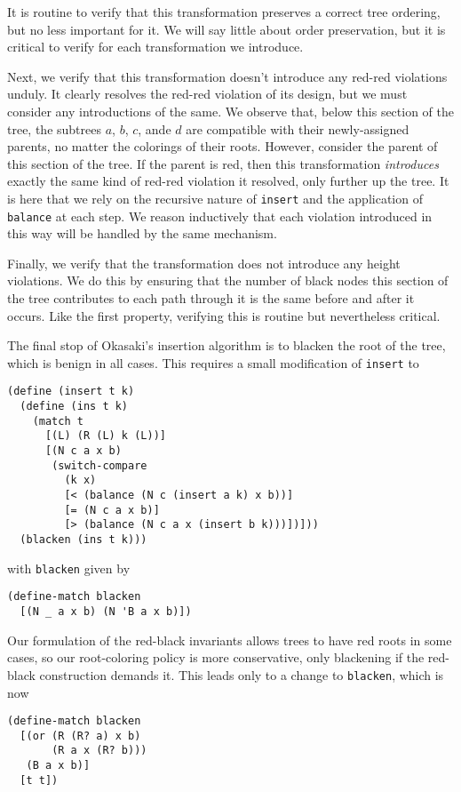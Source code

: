 \documentclass[preprint]{sigplanconf}
\begin{document}
It is routine to verify that this transformation preserves a correct tree ordering, but no less important for it. We will say little about order preservation, but it is critical to verify for each transformation we introduce.

Next, we verify that this transformation doesn't introduce any red-red violations unduly. It clearly resolves the red-red violation of its design, but we must consider any introductions of the same. We observe that, below this section of the tree, the subtrees $a$, $b$, $c$, ande $d$ are compatible with their newly-assigned parents, no matter the colorings of their roots. However, consider the parent of this section of the tree. If the parent is red, then this transformation \emph{introduces} exactly the same kind of red-red violation it resolved, only further up the tree. It is here that we rely on the recursive nature of \texttt{insert} and the application of \texttt{balance} at each step. We reason inductively that each violation introduced in this way will be handled by the same mechanism.

Finally, we verify that the transformation does not introduce any height violations. We do this by ensuring that the number of black nodes this section of the tree contributes to each path through it is the same before and after it occurs. Like the first property, verifying this is routine but nevertheless critical.

The final stop of Okasaki's insertion algorithm is to blacken the root of the tree, which is benign in all cases. This requires a small modification of \texttt{insert} to 
\begin{verbatim}
(define (insert t k)
  (define (ins t k)
    (match t
      [(L) (R (L) k (L))]
      [(N c a x b)
       (switch-compare
         (k x)
         [< (balance (N c (insert a k) x b))]
         [= (N c a x b)]
         [> (balance (N c a x (insert b k)))])]))
  (blacken (ins t k)))
\end{verbatim}
with \texttt{blacken} given by
\begin{verbatim}
(define-match blacken
  [(N _ a x b) (N 'B a x b)])
\end{verbatim}

Our formulation of the red-black invariants allows trees to have red roots in some cases, so our root-coloring policy is more conservative, only blackening if the red-black construction demands it. This leads only to a change to \texttt{blacken}, which is now
\begin{verbatim}
(define-match blacken
  [(or (R (R? a) x b)
       (R a x (R? b)))
   (B a x b)]
  [t t])
\end{verbatim}
\end{document}
